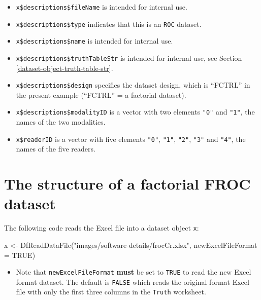 \documentclass[
]{book}
\newenvironment{Shaded}{\begin{snugshade}}{\end{snugshade}}
\newcommand{\AttributeTok}[1]{\textcolor[rgb]{0.77,0.63,0.00}{#1}}
\newcommand{\ConstantTok}[1]{\textcolor[rgb]{0.00,0.00,0.00}{#1}}
\newcommand{\FunctionTok}[1]{\textcolor[rgb]{0.00,0.00,0.00}{#1}}
\newcommand{\NormalTok}[1]{#1}
\newcommand{\OtherTok}[1]{\textcolor[rgb]{0.56,0.35,0.01}{#1}}
\newcommand{\StringTok}[1]{\textcolor[rgb]{0.31,0.60,0.02}{#1}}
\providecommand{\tightlist}{%
  \setlength{\itemsep}{0pt}\setlength{\parskip}{0pt}}
\begin{document}
\begin{itemize}
\tightlist
\item
  \texttt{x\$descriptions\$fileName} is intended for internal use.
\item
  \texttt{x\$descriptions\$type} indicates that this is an \texttt{ROC} dataset.
\item
  \texttt{x\$descriptions\$name} is intended for internal use.
\item
  \texttt{x\$descriptions\$truthTableStr} is intended for internal use, see Section \ref{dataset-object-truth-table-str}.
\item
  \texttt{x\$descriptions\$design} specifies the dataset design, which is ``FCTRL'' in the present example (``FCTRL'' = a factorial dataset).
\item
  \texttt{x\$descriptions\$modalityID} is a vector with two elements \texttt{"0"} and \texttt{"1"}, the names of the two modalities.
\item
  \texttt{x\$readerID} is a vector with five elements \texttt{"0"}, \texttt{"1"}, \texttt{"2"}, \texttt{"3"} and \texttt{"4"}, the names of the five readers.
\end{itemize}

\hypertarget{dataset-object-details-structure-froc-dataset}{%
\section{The structure of a factorial FROC dataset}\label{dataset-object-details-structure-froc-dataset}}

The following code reads the Excel file into a dataset object \texttt{x}:

\begin{Shaded}
\begin{Highlighting}[]
\NormalTok{x }\OtherTok{\textless{}{-}} \FunctionTok{DfReadDataFile}\NormalTok{(}\StringTok{"images/software{-}details/frocCr.xlsx"}\NormalTok{, }\AttributeTok{newExcelFileFormat =} \ConstantTok{TRUE}\NormalTok{)}
\end{Highlighting}
\end{Shaded}

\begin{itemize}
\tightlist
\item
  Note that \texttt{newExcelFileFormat} \textbf{must} be set to \texttt{TRUE} to read the new Excel format dataset. The default is \texttt{FALSE} which reads the original format Excel file with only the first three columns in the \texttt{Truth} worksheet.
\end{itemize}
\end{document}
